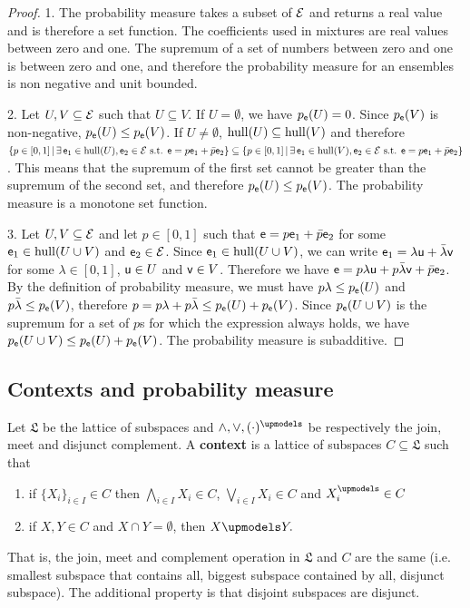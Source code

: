 \begin{proof}
	1. The probability measure takes a subset of $\Ens$ and returns a real value and is therefore a set function. The coefficients used in mixtures are real values between zero and one. The supremum of a set of numbers between zero and one is between zero and one, and therefore the probability measure for an ensembles is non negative and unit bounded.
	
	2. Let $U, V \subseteq \Ens$ such that $U \subseteq V$. If $U = \emptyset$, we have $p_{\ens}(U) = 0$. Since $p_{\ens}(V)$ is non-negative, $p_{\ens}(U) \leq p_{\ens}(V)$. If $U \neq \emptyset$, $\hull(U) \subseteq \hull(V)$ and therefore $\{ p \in [0,1] \, | \, \exists \, \ens_1 \in \hull(U), \ens_2 \in \Ens \text{ s.t. }  \ens = p \ens_1 + \bar{p} \ens_2 \} \subseteq \{ p \in [0,1] \, | \, \exists \, \ens_1 \in \hull(V), \ens_2 \in \Ens \text{ s.t. }  \ens = p \ens_1 + \bar{p} \ens_2 \}$. This means that the supremum of the first set cannot be greater than the supremum of the second set, and therefore $p_{\ens}(U) \leq p_{\ens}(V)$. The probability measure is a monotone set function.
	
	3. Let $U, V \subseteq \Ens$ and let $p \in [0,1]$ such that $\ens = p \ens_1 + \bar{p} \ens_2$ for some $\ens_1 \in \hull(U \cup V)$ and $\ens_2 \in \Ens$. Since $\ens_1 \in \hull(U \cup V)$, we can write $\ens_1 = \lambda \ens[u] + \bar{\lambda} \ens[v]$ for some $\lambda \in [0,1]$, $\ens[u] \in U$ and $\ens[v] \in V$. Therefore we have $\ens = p \lambda \ens[u] + p \bar{\lambda} \ens[v] + \bar{p} \ens_2$. By the definition of probability measure, we must have $p\lambda \leq p_{\ens}(U)$ and $p\bar{\lambda} \leq p_{\ens}(V)$, therefore $p = p\lambda + p\bar{\lambda} \leq p_{\ens}(U) + p_{\ens}(V)$. 	Since $p_{\ens}(U \cup V)$ is the supremum for a set of $p$s for which the expression always holds, we have $p_{\ens}(U \cup V) \leq p_{\ens}(U) + p_{\ens}(V)$. The probability measure is subadditive.
\end{proof}


\subsection{Contexts and probability measure}

\begin{defn}
	Let $\mathfrak{L}$ be the lattice of subspaces and $\wedge, \vee, (\cdot)^\disjunct$ be respectively the join, meet and disjunct complement. A \textbf{context} is a lattice of subspaces $C \subseteq \mathfrak{L}$ such that
	\begin{enumerate}
		\item if $\{X_i\}_{i \in I} \in C$ then $\bigwedge_{i \in I} X_i \in C$, $\bigvee_{i \in I} X_i \in C$ and $X_i^\disjunct \in C$
		\item if $X, Y \in C$ and $X \cap Y = \emptyset$, then $X \disjunct Y.$
	\end{enumerate}
	That is, the join, meet and complement operation in $\mathfrak{L}$ and $C$ are the same (i.e. smallest subspace that contains all, biggest subspace contained by all, disjunct subspace). The additional property is that disjoint subspaces are disjunct.
\end{defn}


